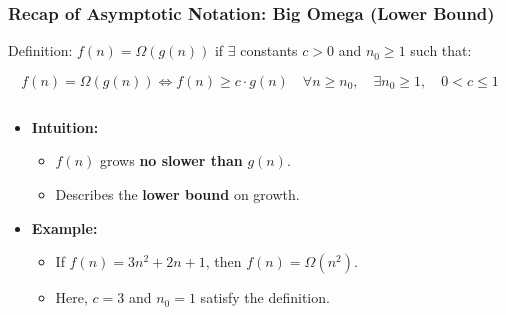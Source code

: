 \begin{frame}
  \frametitle{Recap of Asymptotic Notation: Big Omega (Lower Bound)}

  \begin{block}{Definition:}
          \( f(n) = \Omega(g(n)) \) if $\exists$ constants $c > 0$ and $n_0 \geq 1$ such that:
          
\[
f(n) = \Omega(g(n)) \iff f(n) \geq c \cdot g(n) \quad \forall n \geq n_0,
 \quad \exists n_0 \geq 1, \quad 0 < c \leq 1
\]
\end{block}
  \begin{columns}
    \begin{column}{0.7\textwidth}
          \begin{itemize}
        \item \textbf{Intuition:}
        \begin{itemize}
            \item \( f(n) \) grows \textbf{no slower than} \( g(n) \).
            \vspace{3pt}
            \item Describes the \textbf{lower bound} on growth.
        \end{itemize}
        \item \textbf{Example:}
        \begin{itemize}
            \item If \( f(n) = 3n^2 + 2n + 1 \), then \( f(n) = \Omega(n^2) \).
            \vspace{3pt}
            \item Here, \( c = 3 \) and \( n_0 = 1 \) satisfy the definition.
        \end{itemize}
      \end{itemize}
    \end{column}


\end{columns}
\end{frame}
